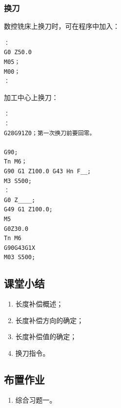 \subsubsection{换刀}
数控铣床上换刀时，可在程序中加入：
\begin{lstlisting}：
G0 Z50.0
M05；
M00；
：
\end{lstlisting}
加工中心上换刀：
\begin{lstlisting}：
：
G28G91Z0；第一次换刀前要回零。

G90;
Tn M6；
G90 G1 Z100.0 G43 Hn F__;
M3 S500;
：
G0 Z____;
G49 G1 Z100.0;
M5
G0Z30.0
Tn M6
G90G43G1X
M03 S500;
\end{lstlisting}



\subsection{课堂小结}
\begin{enumerate}[1、]
\item 长度补偿概述；
\item 长度补偿方向的确定；
\item 长度补偿值的确定；
\item 换刀指令。
\end{enumerate}

\vfill
\subsection{布置作业}
\begin{enumerate}[1、]
	\item 综合习题一。
\end{enumerate}
\vfill